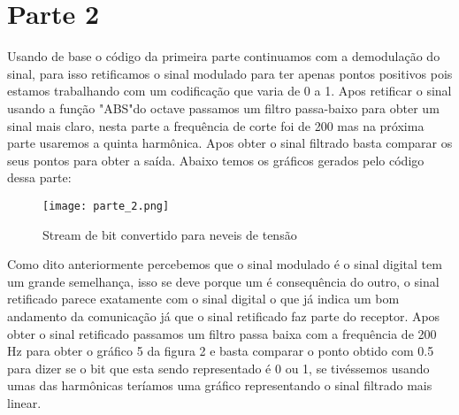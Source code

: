 \documentclass{article}
\begin{document}
    \section{Parte 2}
        Usando de base o código da primeira parte continuamos com a demodulação do sinal, para isso retificamos o sinal modulado para ter apenas pontos positivos pois estamos trabalhando com um codificação que varia de 0 a 1. Apos retificar o sinal usando a função "ABS"do octave passamos um filtro passa-baixo para obter um sinal mais claro, nesta parte a frequência de corte foi de 200 mas na próxima parte usaremos a quinta harmônica. Apos obter o sinal filtrado basta comparar os seus pontos para obter a saída. Abaixo temos os gráficos gerados pelo código dessa parte: 
        \begin{figure}[H]
            \begin{center}
                \texttt{[image: parte\_2.png]}
                \caption{Stream de bit convertido para neveis de tensão}
                \label{fig:Stream de bits convertido}
            \end{center}
        \end{figure}
        Como dito anteriormente percebemos que o sinal modulado é o sinal digital tem um grande semelhança, isso se deve porque um é consequência do outro, o sinal retificado parece exatamente com o sinal digital o que já indica um bom andamento da comunicação já que o sinal retificado faz parte do receptor. Apos obter o sinal retificado passamos um filtro passa baixa com a frequência de 200 Hz para obter o gráfico 5 da figura 2 e basta comparar o ponto obtido com 0.5 para dizer se o bit que esta sendo representado é 0 ou 1, se tivéssemos usando umas das harmônicas teríamos uma gráfico representando o sinal filtrado mais linear.
\end{document}
